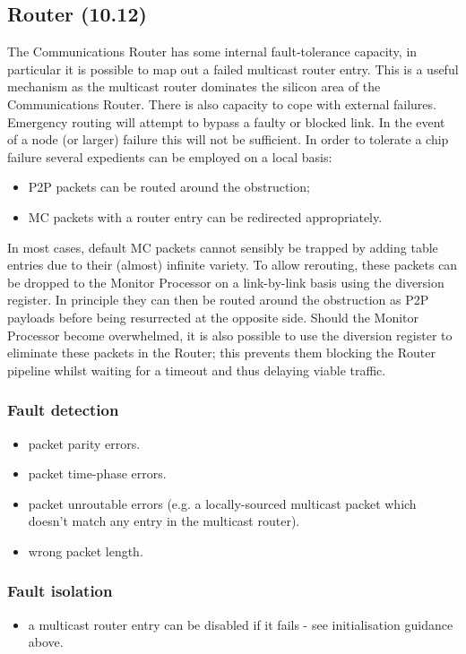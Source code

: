 \documentclass[11pt]{article}
\newenvironment{itmz}{
	\begin{itemize}
		\setlength{\itemsep}{0pt}
		\setlength{\parskip}{0pt}
	}{\end{itemize}}
\begin{document}
\subsection{Router (10.12)}
The Communications Router has some internal fault-tolerance capacity, in particular it is possible
to map out a failed multicast router entry. This is a useful mechanism as the multicast router
dominates the silicon area of the Communications Router.
There is also capacity to cope with external failures. Emergency routing will attempt to bypass a
faulty or blocked link. In the event of a node (or larger) failure this will not be sufficient. In order to
tolerate a chip failure several expedients can be employed on a local basis:
\begin{itmz}
\item P2P packets can be routed around the obstruction;
\item MC packets with a router entry can be redirected appropriately.
\end{itmz}
In most cases, default MC packets cannot sensibly be trapped by adding table entries due to their
(almost) infinite variety. To allow rerouting, these packets can be dropped to the Monitor Processor
on a link-by-link basis using the diversion register. In principle they can then be routed around the
obstruction as P2P payloads before being resurrected at the opposite side.
Should the Monitor Processor become overwhelmed, it is also possible to use the diversion register
to eliminate these packets in the Router; this prevents them blocking the Router pipeline whilst
waiting for a timeout and thus delaying viable traffic.
\subsubsection*{Fault detection}
\begin{itmz}
\item packet parity errors.
\item packet time-phase errors.
\item packet unroutable errors (e.g. a locally-sourced multicast packet which doesn’t match any entry
in the multicast router).
\item wrong packet length.
\end{itmz}
\subsubsection*{Fault isolation}
\begin{itmz}
\item a multicast router entry can be disabled if it fails - see initialisation guidance above.
\end{itmz}
\end{document}

